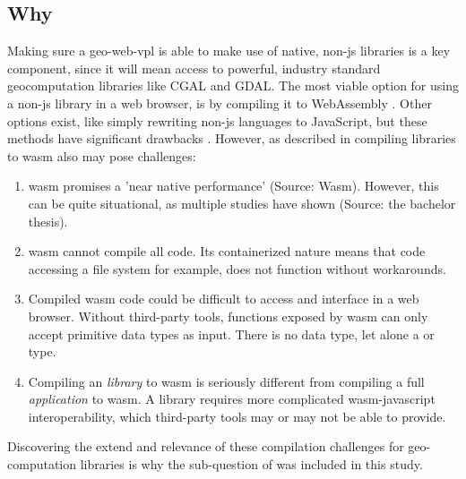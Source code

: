 \subsection*{Why}

Making sure a \ac{geo-web-vpl} is able to make use of native, non-js libraries is a key component, since it will mean access to powerful, industry standard geocomputation libraries like CGAL and GDAL. 
The most viable option for using a non-js library in a web browser, is by compiling it to WebAssembly \cite{haas_bringing_2017}.
Other options exist, like simply rewriting non-js languages to JavaScript, but these methods have significant drawbacks \cite{haas_bringing_2017,jangda_not_2019}.
However, as described in  compiling libraries to \ac{wasm} also may pose challenges:


\begin{enumerate}[-]
  \item \ac{wasm} promises a 'near native performance' (Source: Wasm). However, this can be quite situational, as multiple studies have shown \cite{jangda_not_2019} (Source: the bachelor thesis). 
  \item \ac{wasm} cannot compile all code. Its containerized nature means that code accessing a file system for example, does not function without workarounds. 
  \item Compiled \ac{wasm} code could be difficult to access and interface in a web browser. Without third-party tools, functions exposed by \ac{wasm} can only accept primitive data types as input. There is no  data type, let alone a  or  type. 
  \item Compiling an \emph{library} to \ac{wasm} is seriously different from compiling a full \emph{application} to wasm. A library requires more complicated wasm-javascript interoperability, which third-party tools may or may not be able to provide.
\end{enumerate}
Discovering the extend and relevance of these compilation challenges for geo-computation libraries is why the sub-question of \mySubRQTwoTitle \space was included in this study. 


